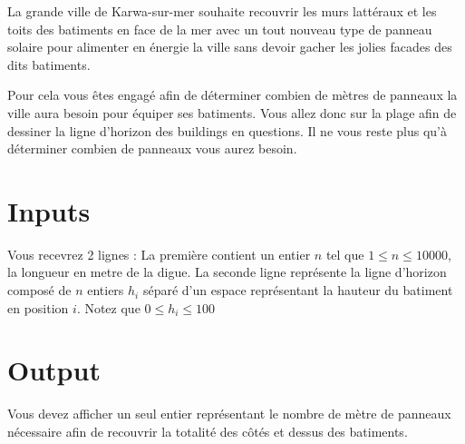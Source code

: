 
La grande ville de Karwa-sur-mer souhaite recouvrir les murs lattéraux et les toits des batiments en face de la mer avec un tout nouveau type de panneau solaire pour alimenter en énergie la ville sans devoir gacher les jolies facades des dits batiments. 

Pour cela vous êtes engagé afin de déterminer combien de mètres de panneaux la ville aura besoin pour équiper ses batiments. Vous allez donc sur la plage afin de dessiner la ligne d'horizon des buildings en questions. Il ne vous reste plus qu'à déterminer combien de panneaux vous aurez besoin.


\section*{Inputs}
Vous recevrez 2 lignes :
La première contient un entier $n$ tel que $1 \leq n \leq 10 000$, la longueur en metre de la digue.
La seconde ligne représente la ligne d'horizon composé de $n$ entiers $h_{i}$ séparé d'un espace représentant la hauteur du batiment en position $i$. Notez que $0 \leq h_{i} \leq 100$

\section*{Output}
Vous devez afficher un seul entier représentant le nombre de mètre de panneaux nécessaire afin de recouvrir la totalité des côtés et dessus des batiments.